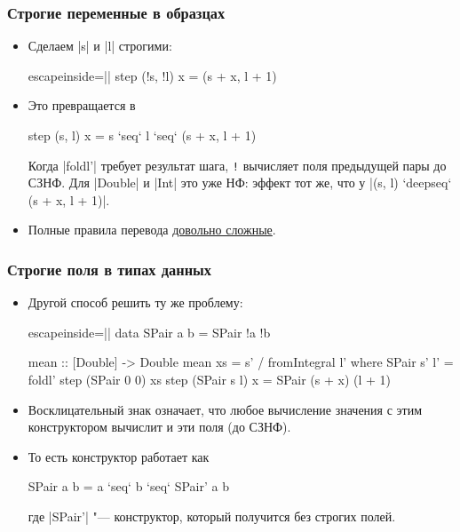 \documentclass[11pt]{beamer}
\begin{document}
\begin{frame}[fragile]
  \frametitle{Строгие переменные в образцах}
  \begin{itemize}
    \item Сделаем \haskinline|s| и \haskinline|l| строгими:
          \begin{haskell*}{escapeinside=||}
            step (!s, !l) x = (s + x, l + 1)
          \end{haskell*}
    \item Это превращается в
          \begin{haskell}
            step (s, l) x = s `seq` l `seq` (s + x, l + 1)
          \end{haskell}
          Когда \haskinline|foldl'| требует результат шага, \texttt{!} вычисляет поля предыдущей пары до СЗНФ. Для \haskinline|Double| и \haskinline|Int| это уже НФ: эффект тот же, что у \haskinline|(s, l) `deepseq` (s + x, l + 1)|.
    \item Полные правила перевода \href{https://downloads.haskell.org/~ghc/latest/docs/html/users_guide/exts/strict.html#bang-patterns-informal}{довольно сложные}.
  \end{itemize}
\end{frame}

\begin{frame}[fragile]
  \frametitle{Строгие поля в типах данных}
  \begin{itemize}
    \item Другой способ решить ту же проблему:
          \begin{haskellsmall*}{escapeinside=||}
            data SPair a b = SPair !a !b

            mean :: [Double] -> Double
            mean xs = s' / fromIntegral l'
              where SPair s' l' = foldl' step (SPair 0 0) xs
                    step (SPair s l) x = SPair (s + x) (l + 1)
          \end{haskellsmall*}
          \pause
    \item Восклицательный знак означает, что любое вычисление значения с этим конструктором вычислит и эти поля (до СЗНФ).
    \item То есть конструктор работает как
          \begin{haskell}
            SPair a b = a `seq` b `seq` SPair' a b
          \end{haskell}
          где \haskinline|SPair'| "--- конструктор, который получится без строгих полей.
  \end{itemize}
\end{frame}
\end{document}
